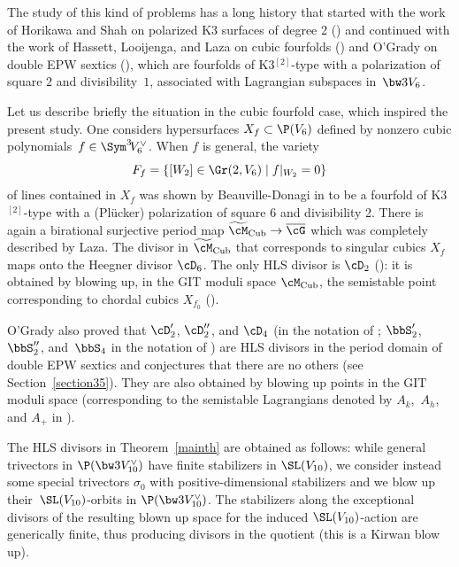 The study of this kind of problems has a long history that started with the work of Horikawa and Shah on polarized K3 surfaces of degree 2 (\cite{hor,sha}) and continued with the work of Hassett, Looijenga, and Laza on cubic fourfolds (\cite{hassett,loo,looijenga,laza,lazagit}) and O'Grady on double EPW sextics (\cite{og6,og5}), which are \hk fourfolds of K3$^{[2]}$-type with a polarization of square $2 $ and divisibility~$1$, associated with Lagrangian subspaces in~$\bw3V_6$.

Let us describe briefly the situation in the cubic fourfold case, which inspired the present study. One considers hypersurfaces $X_f\subset \P(V_6)$ defined by nonzero cubic polynomials~$f\in\Sym^3\!V_6^\vee$. When $f$ is general,
the variety
\[
F_f=\{[W_2]\in \Gr(2,V_{6}) \mid f\vert_{W_2}=0\}
\]
of lines contained in $X_f$ was shown by Beauville-Donagi in \cite{beaudo} to be a \hk fourfold of K3$^{[2]}$-type with a (Plücker) polarization of square $6$ and divisibility 2. There is again a birational surjective period map
$\widetilde\cM_{\textnormal{Cub}}\to \overline\cG$ which was completely described by Laza. The divisor in $\widetilde\cM_{\textnormal{Cub}}$ that corresponds to singular cubics $X_f$ maps onto the Heegner divisor $\cD_6$. The only HLS divisor is $\cD_2$ (\cite{hassett,looijenga,laza}):
it is obtained by blowing up, in the GIT moduli space $\cM_{\textnormal{Cub}}$, the semistable point corresponding to chordal cubics $X_{f_0} $ (\cite[\S 4.1.1]{laza}).

O'Grady also proved that $\cD'_2$, $\cD''_2$, and $\cD_4$ (in the notation of \cite[Cor.\,6.3]{dims}; $\bbS'_2$, $\bbS''_2$, and~$ \bbS_4$ in the notation of \cite{og6}) are HLS divisors in the period domain of double EPW sextics and conjectures that there are no others (see Section~\ref{section35}). They are also obtained by blowing up points in the GIT moduli space (corresponding to the semistable Lagrangians denoted by $A_k$,~$A_h$, and $A_+$ in \cite{og5}).

The HLS divisors in Theorem~\ref{mainth} are obtained as follows: while general trivectors in $ \P(\bw3V_{10}^\vee)$ have finite stabilizers in $\SL(V_{10})$, we consider instead some
special trivectors $\sigma_0 $ with positive-dimensional stabilizers and we blow up their~$\SL(V_{10})$-orbits in $ {\P(\bw3V_{10}^\vee)}$. The stabilizers along the exceptional divisors of the resulting blown up space for the induced $\SL(V_{10})$-action are generically finite, thus producing divisors in the quotient (this is a Kirwan blow up).

